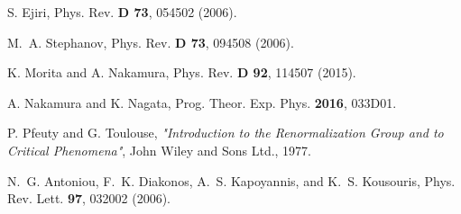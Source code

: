 \documentclass[aps,pre,showpacs,amsmath,amssymb,superscriptaddress,twocolumn]{revtex4-1}
\begin{document}
\begin{thebibliography}{99}
 S. Ejiri, Phys. Rev. {\bf D 73}, 054502 (2006).

 M.~A. Stephanov, Phys. Rev. {\bf D 73}, 094508 (2006).

 K. Morita and A. Nakamura, Phys. Rev. {\bf D 92}, 114507 (2015).

 A. Nakamura and K. Nagata, Prog. Theor. Exp. Phys. {\bf 2016}, 033D01.

 P. Pfeuty and G. Toulouse, \textit{"Introduction to the Renormalization Group and to Critical Phenomena"}, John Wiley and Sons Ltd., 1977.

 N.~G. Antoniou, F.~K. Diakonos, A.~S. Kapoyannis, and K.~S. Kousouris, Phys. Rev. Lett. {\bf 97}, 032002 (2006).

\end{thebibliography}
\end{document}
